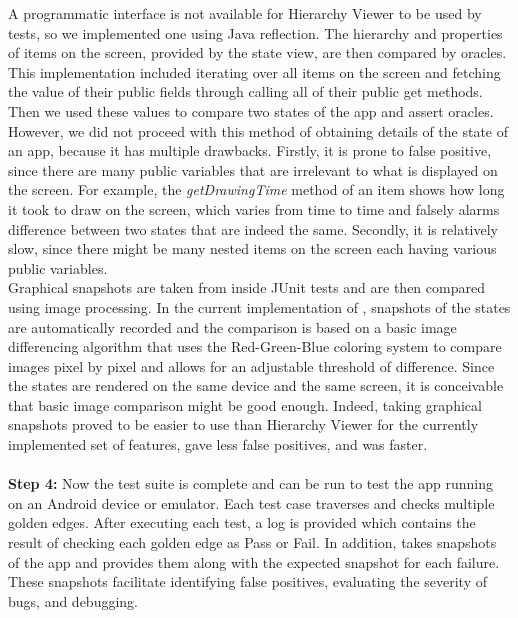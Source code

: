 A programmatic interface is not available for Hierarchy Viewer to be used by tests, so we implemented one using Java reflection. The hierarchy and properties of items on the screen, provided by the state view, are then compared by oracles.
This implementation included iterating over all items on the screen and fetching the value of their public fields through calling all of their public get methods. Then we used these values to compare two states of the app and assert oracles. However, we did not proceed with this method of obtaining details of the state of an app, because it has multiple drawbacks. Firstly, it is prone to false positive, since there are many public variables that are irrelevant to what is displayed on the screen. For example, the  \emph{getDrawingTime} method of an item shows how long it took to draw on the screen, which varies from time to time and falsely alarms difference between two states that are indeed the same. Secondly, it is relatively slow, since there might be many nested items on the screen each having various public variables.
\\
\indent
Graphical snapshots are taken from inside JUnit tests and are then compared using image processing. In the current implementation of \tool{}, snapshots of the states are automatically recorded and the comparison is based on a basic image differencing algorithm that uses the Red-Green-Blue coloring system to compare images pixel by pixel and allows for an adjustable threshold of difference.
Since the states are rendered on the same device and the same screen, it is conceivable that basic image comparison might be good enough. Indeed, taking graphical snapshots proved to be easier to use than Hierarchy Viewer for the currently implemented set of features, gave less false positives, and was faster.
\\
%
\indent
\\
\indent
{\bf Step 4:}
Now the test suite is complete and can be run to test the app running on an Android device or emulator.
Each test case traverses and checks multiple golden edges. After executing each test, a log is provided which contains the result of checking each golden edge as Pass or Fail. In addition, \tool{} takes snapshots of the app and provides them along with the expected snapshot for each failure. These snapshots facilitate identifying false positives, evaluating the severity of bugs, and debugging.

